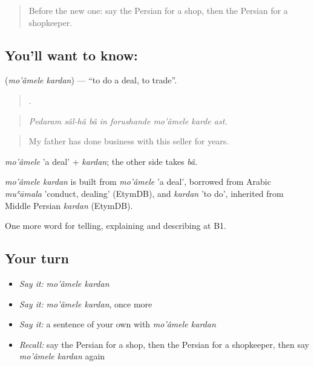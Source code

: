\label{lesson:FA-C464-moamele-kardan}



\begin{quote}
Before the new one: say the Persian for a shop, then the Persian for a shopkeeper.
\end{quote}

\subsection*{You'll want to know:  }
\textbf{ } (\emph{mo'âmele kardan}) — \textquotedblleft{}to do a deal, to trade\textquotedblright{}.

\begin{quote}
       .
\end{quote}

\begin{quote}
\emph{Pedaram sâl-hâ bâ in forushande mo'âmele karde ast.}
\end{quote}

\begin{quote}
My father has done business with this seller for years.
\end{quote}

\emph{mo'âmele} 'a deal' + \emph{kardan}; the other side takes \emph{bâ}.

\begin{cousinweb}
\emph{mo'âmele kardan} is built from \emph{mo'âmele} 'a deal', borrowed from Arabic \emph{muʿāmala} 'conduct, dealing' (EtymDB), and \emph{kardan} 'to do', inherited from Middle Persian \emph{kardan} (EtymDB).
\end{cousinweb}

\begin{grammarlens}[title={What you've built}]
One more word for telling, explaining and describing at B1.
\end{grammarlens}

\subsection*{Your turn}
\begin{itemize}
\raggedright
  \item \emph{Say it:} \emph{mo'âmele kardan}
  \item \emph{Say it:} \emph{mo'âmele kardan}, once more
  \item \emph{Say it:} a sentence of your own with \emph{mo'âmele kardan}
  \item \emph{Recall:} say the Persian for a shop, then the Persian for a shopkeeper, then say \emph{mo'âmele kardan} again
\end{itemize}

